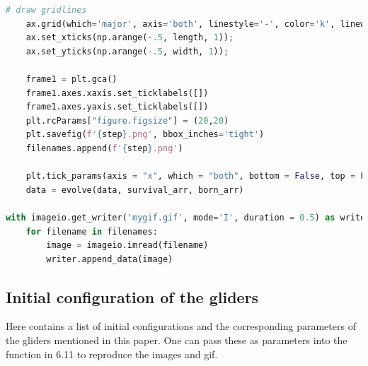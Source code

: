 \documentclass[12pt]{article}
\numberwithin{figure}{section} %
\begin{document}
\begin{lstlisting}[language = Python]
    # draw gridlines
    ax.grid(which='major', axis='both', linestyle='-', color='k', linewidth=2)
    ax.set_xticks(np.arange(-.5, length, 1));
    ax.set_yticks(np.arange(-.5, width, 1));

    frame1 = plt.gca()
    frame1.axes.xaxis.set_ticklabels([])
    frame1.axes.yaxis.set_ticklabels([])
    plt.rcParams["figure.figsize"] = (20,20)
    plt.savefig(f'{step}.png', bbox_inches='tight')
    filenames.append(f'{step}.png')
    
    plt.tick_params(axis = "x", which = "both", bottom = False, top = False)
    data = evolve(data, survival_arr, born_arr)

with imageio.get_writer('mygif.gif', mode='I', duration = 0.5) as writer:
    for filename in filenames:
        image = imageio.imread(filename)
        writer.append_data(image)
\end{lstlisting}

\subsection{Initial configuration of the gliders}
Here contains a list of initial configurations and the corresponding parameters of the gliders mentioned in this paper. One can pass these as parameters into the function in 6.11 to reproduce the images and gif. 
\end{document}
